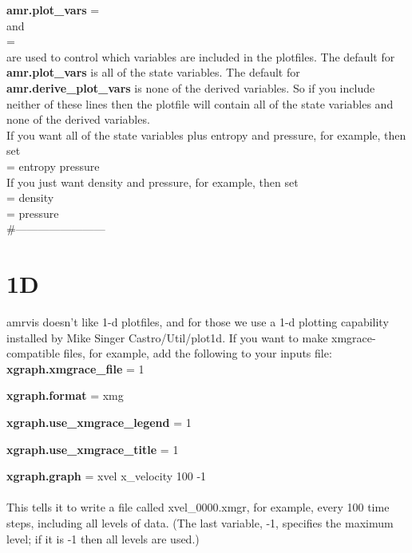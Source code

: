 {\bf amr.plot\_vars} = \\

\noindent and  \\

 = \\

\noindent are used to control which variables are included in the plotfiles.  The default for {\bf amr.plot\_vars}
is all of the state variables.  The default for {\bf amr.derive\_plot\_vars} is none of
the derived variables.  So if you include neither of these lines then the plotfile
will contain all of the state variables and none of the derived variables. \\

\noindent If you want all of the state variables plus entropy and pressure, for example, then set \\

 = entropy pressure \\

\noindent If you just want density and pressure, for example, then set \\

 =  density \\

 = pressure \\


\#------------------------

\section{1D}
amrvis doesn't like 1-d plotfiles, and for those we use a 1-d plotting capability installed by Mike Singer 
Castro/Util/plot1d.  If you want to make xmgrace-compatible files, for example, add the following to your inputs file:\\

{\bf xgraph.xmgrace\_file} = 1

{\bf xgraph.format} = xmg

{\bf xgraph.use\_xmgrace\_legend} = 1

{\bf xgraph.use\_xmgrace\_title} = 1

{\bf xgraph.graph} = xvel x\_velocity 100 -1\\ \\
This tells it to write a file called xvel\_0000.xmgr, for example, every 100 time steps, including all levels of data. (The last variable, -1, specifies the maximum level; if it is -1 then all levels are used.)

